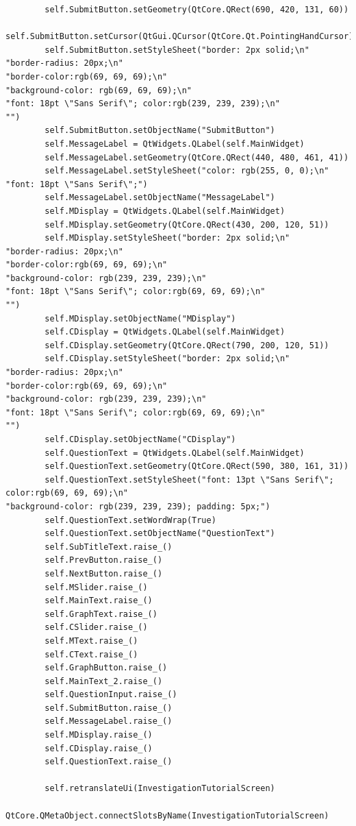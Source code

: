 \documentclass[12pt]{article}
\begin{document}
\begin{lstlisting}
        self.SubmitButton.setGeometry(QtCore.QRect(690, 420, 131, 60))
        self.SubmitButton.setCursor(QtGui.QCursor(QtCore.Qt.PointingHandCursor))
        self.SubmitButton.setStyleSheet("border: 2px solid;\n"
"border-radius: 20px;\n"
"border-color:rgb(69, 69, 69);\n"
"background-color: rgb(69, 69, 69);\n"
"font: 18pt \"Sans Serif\"; color:rgb(239, 239, 239);\n"
"")
        self.SubmitButton.setObjectName("SubmitButton")
        self.MessageLabel = QtWidgets.QLabel(self.MainWidget)
        self.MessageLabel.setGeometry(QtCore.QRect(440, 480, 461, 41))
        self.MessageLabel.setStyleSheet("color: rgb(255, 0, 0);\n"
"font: 18pt \"Sans Serif\";")
        self.MessageLabel.setObjectName("MessageLabel")
        self.MDisplay = QtWidgets.QLabel(self.MainWidget)
        self.MDisplay.setGeometry(QtCore.QRect(430, 200, 120, 51))
        self.MDisplay.setStyleSheet("border: 2px solid;\n"
"border-radius: 20px;\n"
"border-color:rgb(69, 69, 69);\n"
"background-color: rgb(239, 239, 239);\n"
"font: 18pt \"Sans Serif\"; color:rgb(69, 69, 69);\n"
"")
        self.MDisplay.setObjectName("MDisplay")
        self.CDisplay = QtWidgets.QLabel(self.MainWidget)
        self.CDisplay.setGeometry(QtCore.QRect(790, 200, 120, 51))
        self.CDisplay.setStyleSheet("border: 2px solid;\n"
"border-radius: 20px;\n"
"border-color:rgb(69, 69, 69);\n"
"background-color: rgb(239, 239, 239);\n"
"font: 18pt \"Sans Serif\"; color:rgb(69, 69, 69);\n"
"")
        self.CDisplay.setObjectName("CDisplay")
        self.QuestionText = QtWidgets.QLabel(self.MainWidget)
        self.QuestionText.setGeometry(QtCore.QRect(590, 380, 161, 31))
        self.QuestionText.setStyleSheet("font: 13pt \"Sans Serif\"; color:rgb(69, 69, 69);\n"
"background-color: rgb(239, 239, 239); padding: 5px;")
        self.QuestionText.setWordWrap(True)
        self.QuestionText.setObjectName("QuestionText")
        self.SubTitleText.raise_()
        self.PrevButton.raise_()
        self.NextButton.raise_()
        self.MSlider.raise_()
        self.MainText.raise_()
        self.GraphText.raise_()
        self.CSlider.raise_()
        self.MText.raise_()
        self.CText.raise_()
        self.GraphButton.raise_()
        self.MainText_2.raise_()
        self.QuestionInput.raise_()
        self.SubmitButton.raise_()
        self.MessageLabel.raise_()
        self.MDisplay.raise_()
        self.CDisplay.raise_()
        self.QuestionText.raise_()

        self.retranslateUi(InvestigationTutorialScreen)
        QtCore.QMetaObject.connectSlotsByName(InvestigationTutorialScreen)


\end{lstlisting}
\end{document}
